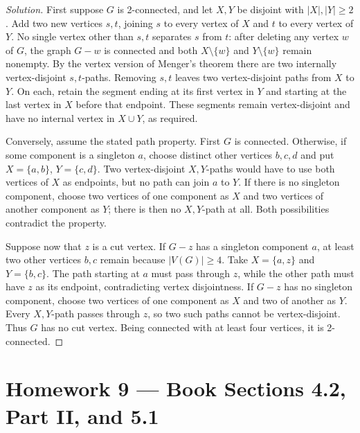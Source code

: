 \documentclass[12pt]{amsart}
\newenvironment{solution}{\begin{proof}[Solution]}{\end{proof}}
\begin{document}
    \begin{solution}

        First suppose $G$ is 2-connected, and let $X,Y$ be disjoint
        with $|X|,|Y|\ge2$. Add two new vertices $s,t$, joining $s$
        to every vertex of $X$ and $t$ to every vertex of $Y$.
        No single vertex other than $s,t$ separates $s$ from $t$:
        after deleting any vertex $w$ of $G$, the graph $G-w$ is
        connected and both $X\setminus\{w\}$ and
        $Y\setminus\{w\}$ remain nonempty. By the vertex version of
        Menger's theorem there are two internally vertex-disjoint
        $s,t$-paths. Removing $s,t$ leaves two vertex-disjoint paths
        from $X$ to $Y$. On each, retain the segment ending at its
        first vertex in $Y$ and starting at the last vertex in $X$
        before that endpoint. These segments remain vertex-disjoint
        and have no internal vertex in $X\cup Y$, as required.

        Conversely, assume the stated path property. First $G$ is
        connected. Otherwise, if some component is a singleton $a$,
        choose distinct other vertices $b,c,d$ and put
        $X=\{a,b\}$, $Y=\{c,d\}$. Two vertex-disjoint $X,Y$-paths
        would have to use both vertices of $X$ as endpoints, but no
        path can join $a$ to $Y$. If there is no singleton component,
        choose two vertices of one component as $X$ and two vertices
        of another component as $Y$; there is then no $X,Y$-path at all.
        Both possibilities contradict the property.

        Suppose now that $z$ is a cut vertex. If $G-z$ has a singleton
        component $a$, at least two other vertices $b,c$ remain because
        $|V(G)|\ge4$. Take $X=\{a,z\}$ and $Y=\{b,c\}$.
        The path starting at $a$ must pass through $z$, while the
        other path must have $z$ as its endpoint, contradicting vertex
        disjointness. If $G-z$ has no singleton component, choose two
        vertices of one component as $X$ and two of another as $Y$.
        Every $X,Y$-path passes through $z$, so two such paths cannot
        be vertex-disjoint. Thus $G$ has no cut vertex. Being connected
        with at least four vertices, it is 2-connected.
    \end{solution}

    \clearpage
    \section*{Homework 9 --- Book Sections 4.2, Part II, and 5.1}
\end{document}
